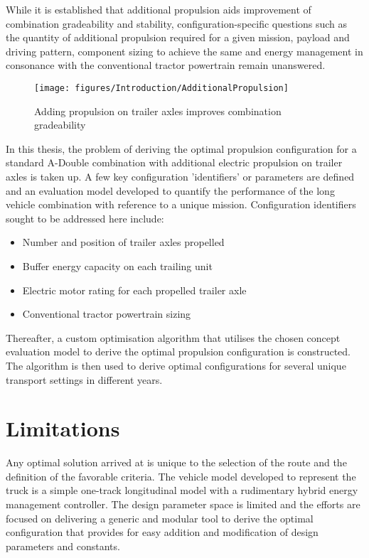 \documentclass[MastersThesis.tex]{subfiles}
\begin{document}
	While it is established that additional propulsion aids improvement of combination gradeability and stability, configuration-specific questions such as the quantity of additional propulsion required for a given mission, payload and driving pattern, component sizing to achieve the same and energy management in consonance with the conventional tractor powertrain remain unanswered. \\

	\begin{figure}[ht!]
		\begin{center}
			\texttt{[image: figures/Introduction/AdditionalPropulsion]}
		\end{center}
		\caption{Adding propulsion on trailer axles improves combination gradeability}
		\label{AdditionalPropulsion}
	\end{figure}

	In this thesis, the problem of deriving the optimal propulsion configuration for a standard A-Double combination with additional electric propulsion on trailer axles is taken up. A few key configuration 'identifiers' or parameters are defined and an evaluation model developed to quantify the performance of the long vehicle combination with reference to a unique mission. Configuration identifiers sought to be addressed here include:

	\begin{itemize}
		\item Number and position of trailer axles propelled
		\item Buffer energy capacity on each trailing unit
		\item Electric motor rating for each propelled trailer axle
		\item Conventional tractor powertrain sizing
	\end{itemize}

	Thereafter, a custom optimisation algorithm that utilises the chosen concept evaluation model to derive the optimal propulsion configuration is constructed. The algorithm is then used to derive optimal configurations for several unique transport settings in different years. 

\section{Limitations}\label{sec:introlimitation}
	Any optimal solution arrived at is unique to the selection of the route and the definition of the favorable criteria. The vehicle model developed to represent the truck is a simple one-track longitudinal model with a rudimentary hybrid energy management controller. The design parameter space is limited and the efforts are focused on delivering a generic and modular tool to derive the optimal configuration that provides for easy addition and modification of design parameters and constants.
\end{document}
